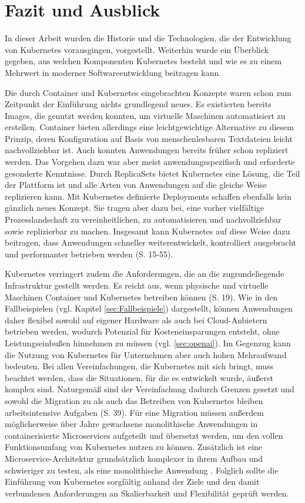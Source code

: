 \documentclass[11pt,a4paper]{article}
\begin{document}
\section{Fazit und Ausblick}
In dieser Arbeit wurden die Historie und die Technologien, die der Entwicklung von Kubernetes
vorausgingen, vorgestellt. Weiterhin wurde ein Überblick gegeben, aus welchen Komponenten
Kubernetes besteht und wie es zu einem Mehrwert in moderner Softwareentwicklung
beitragen kann.

Die durch Container und Kubernetes eingebrachten Konzepte waren schon zum Zeitpunkt der Einführung
nichts grundlegend neues.
Es existierten bereits Images, die genutzt werden konnten, um virtuelle Maschinen automatisiert
zu erstellen. Container bieten allerdings eine leichtgewichtige Alternative zu diesem Prinzip,
deren Konfiguration auf Basis von menschenlesbaren Textdateien leicht nachvollziehbar ist.
Auch konnten Anwendungen bereits früher schon repliziert werden.
Das Vorgehen dazu war aber meist anwendungsspezifisch und erforderte gesonderte Kenntnisse.
Durch \mbox{ReplicaSets} bietet Kubernetes eine Lösung, die Teil der Plattform ist
und alle Arten von Anwendungen auf die gleiche Weise replizieren kann.
Mit Kubernetes definierte Deployments schaffen ebenfalls kein gänzlich neues Konzept.
Sie tragen aber dazu bei, eine vorher vielfältige Prozesslandschaft zu vereinheitlichen,
zu automatisieren und nachvollziehbar sowie replizierbar zu machen.
Insgesamt kann Kubernetes auf diese Weise dazu beitragen, dass
Anwendungen schneller weiterentwickelt, kontrolliert ausgebracht und
performanter betrieben werden \cite{Schmeling_Dargatz_2022} (S. 15-55).

Kubernetes verringert zudem die Anforderungen, die an die zugrundeliegende
Infrastruktur gestellt werden. Es reicht aus, wenn physische und virtuelle Maschinen
Container und Kubernetes betreiben können \cite{cicd_with_kubernetes_devops} (S. 19).
Wie in den Fallbeispielen (vgl. Kapitel \ref{sec:Fallbeispiele}) dargestellt, können Anwendungen daher
flexibel sowohl auf eigener Hardware als auch bei Cloud-Anbietern betrieben werden,
wodurch Potenzial für Kosteneinsparungen entsteht, ohne Leistungseinbußen
hinnehmen zu müssen (vgl. \ref{sec:openai}).
Im Gegenzug kann die Nutzung von Kubernetes für Unternehmen aber auch
hohen Mehraufwand bedeuten.
Bei allen Vereinfachungen, die Kubernetes mit sich bringt, muss beachtet werden,
dass die Situationen, für die es entwickelt wurde, äußerst komplex sind.
Naturgemäß sind der Vereinfachung dadurch Grenzen gesetzt und
sowohl die Migration zu als auch das Betreiben von Kubernetes bleiben
arbeitsintensive Aufgaben \cite{domingus2022cloud} (S. 39).
Für eine Migration müssen außerdem möglicherweise über Jahre gewachsene monolithische
Anwendungen in containerisierte Microservices aufgeteilt und übersetzt werden,
um den vollen Funktionsumfang von Kubernetes nutzen zu können.
Zusätzlich ist eine Microservice-Architektur grundsätzlich komplexer
in ihrem Aufbau und schwieriger zu testen, als eine monolithische Anwendung \cite{8406008}.
Folglich sollte die Einführung von Kubernetes sorgfältig anhand der Ziele
und den damit verbundenen Anforderungen an Skalierbarkeit und Flexibilität
geprüft werden.
\end{document}
